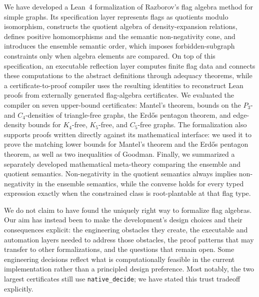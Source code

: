 \documentclass{article}
\newcommand{\lean}[1]{\texttt{#1}}
\begin{document}
We have developed a Lean~4 formalization of Razborov's flag algebra method for
simple graphs.  Its specification layer represents flags as quotients modulo
isomorphism, constructs the quotient algebra of density-expansion relations,
defines positive homomorphisms and the semantic non-negativity cone, and
introduces the ensemble semantic order, which imposes forbidden-subgraph
constraints only when algebra elements are compared.  On top of this
specification, an executable reflection layer computes finite flag data and
connects these computations to the abstract definitions through adequacy
theorems, while a certificate-to-proof compiler uses the resulting identities
to reconstruct Lean proofs from externally generated flag-algebra
certificates.  We evaluated the compiler on seven upper-bound certificates:
Mantel's theorem, bounds on the \(P_3\)- and \(C_4\)-densities of triangle-free
graphs, the Erd\H{o}s pentagon theorem, and edge-density bounds for
\(K_4\)-free, \(K_5\)-free, and \(C_5\)-free graphs.  The formalization also
supports proofs written directly against its mathematical interface: we used
it to prove the matching lower bounds for Mantel's theorem and the
Erd\H{o}s pentagon theorem, as well as two inequalities of Goodman.  Finally,
we summarized a separately developed mathematical meta-theory comparing the
ensemble and quotient semantics.  Non-negativity in the quotient semantics
always implies non-negativity in the ensemble semantics, while the converse
holds for every typed expression exactly when the constrained class is
root-plantable at that flag type.

We do not claim to have found the uniquely right way to formalize flag
algebras.  Our aim has instead been to make the development's design choices
and their consequences explicit: the engineering obstacles they create, the
executable and automation layers needed to address those obstacles, the proof
patterns that may transfer to other formalizations, and the questions that
remain open.  Some engineering decisions reflect what is computationally
feasible in the current implementation rather than a principled design
preference.  Most notably, the two largest certificates still use
\lean{native\_decide}; we have stated this trust tradeoff explicitly.
\end{document}
